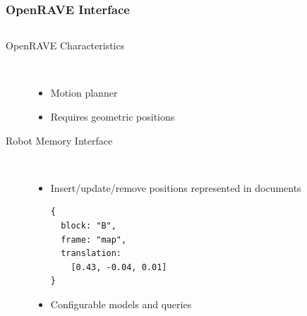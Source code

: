 \begin{frame}[fragile]
  \frametitle{OpenRAVE Interface}
  \begin{columns}
    \begin{column}{0.6\textwidth}
  \begin{description}
  \item[OpenRAVE Characteristics]%
                \hfill \\
    \begin{itemize}
    \item Motion planner
    \item Requires geometric positions
    \end{itemize}
  \item[Robot Memory Interface]%
                \hfill \\
    \begin{itemize}
    \item Insert/update/remove positions represented in documents
\begin{lstlisting}[style=SmallJSON,
  framexleftmargin=5pt, xleftmargin=0pt,linewidth=5cm,
 morekeywords={}, numbers=none]
{
  block: "B",
  frame: "map",
  translation:
    [0.43, -0.04, 0.01]
}
\end{lstlisting}
    \item Configurable models and queries
    \end{itemize}
  \end{description}
    \end{column}
    \begin{column}{0.4\textwidth}

\end{column}
\end{columns}
\end{frame}
